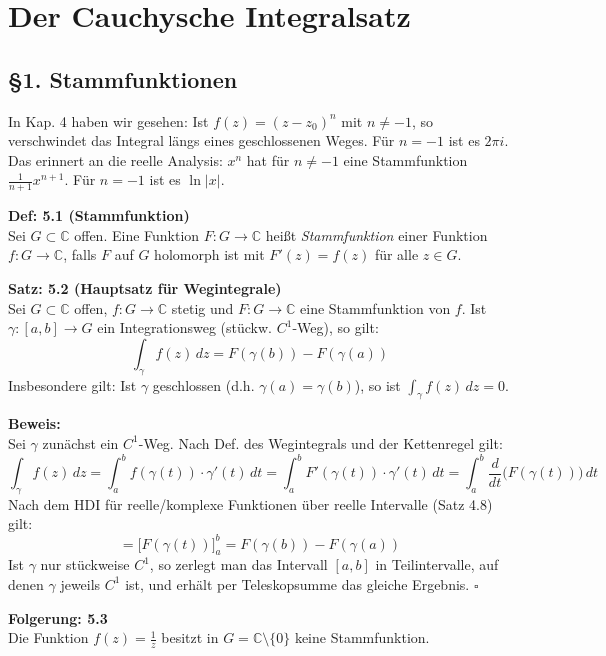 \section{Der Cauchysche Integralsatz}

\subsection*{\S 1. Stammfunktionen}

In Kap. 4 haben wir gesehen: Ist $f(z) = (z-z_0)^n$ mit $n \neq -1$, so verschwindet das Integral längs eines geschlossenen Weges. Für $n=-1$ ist es $2\pi i$. Das erinnert an die reelle Analysis: $x^n$ hat für $n \neq -1$ eine Stammfunktion $\frac{1}{n+1}x^{n+1}$. Für $n=-1$ ist es $\ln|x|$.

\vspace{1em}
\noindent\textbf{Def: 5.1 (Stammfunktion)} \\
Sei $G \subset \mathbb{C}$ offen. Eine Funktion $F: G \rightarrow \mathbb{C}$ heißt \textit{Stammfunktion} einer Funktion $f: G \rightarrow \mathbb{C}$, falls $F$ auf $G$ holomorph ist mit $F'(z) = f(z)$ für alle $z \in G$.

\vspace{1em}
\noindent\textbf{Satz: 5.2 (Hauptsatz für Wegintegrale)} \\
Sei $G \subset \mathbb{C}$ offen, $f: G \rightarrow \mathbb{C}$ stetig und $F: G \rightarrow \mathbb{C}$ eine Stammfunktion von $f$. Ist $\gamma: [a,b] \rightarrow G$ ein Integrationsweg (stückw. $C^1$-Weg), so gilt:
\[
\int_{\gamma} f(z) \, dz = F(\gamma(b)) - F(\gamma(a))
\]
Insbesondere gilt: Ist $\gamma$ geschlossen (d.h. $\gamma(a) = \gamma(b)$), so ist $\int_{\gamma} f(z) \, dz = 0$.

\vspace{1em}
\noindent\textbf{Beweis:} \\
Sei $\gamma$ zunächst ein $C^1$-Weg. Nach Def. des Wegintegrals und der Kettenregel gilt:
\[
\int_{\gamma} f(z) \, dz = \int_{a}^{b} f(\gamma(t)) \cdot \gamma'(t) \, dt = \int_{a}^{b} F'(\gamma(t)) \cdot \gamma'(t) \, dt = \int_{a}^{b} \frac{d}{dt} \big(F(\gamma(t))\big) \, dt
\]
Nach dem HDI für reelle/komplexe Funktionen über reelle Intervalle (Satz 4.8) gilt:
\[
= \big[F(\gamma(t))\big]_{a}^{b} = F(\gamma(b)) - F(\gamma(a))
\]
Ist $\gamma$ nur stückweise $C^1$, so zerlegt man das Intervall $[a,b]$ in Teilintervalle, auf denen $\gamma$ jeweils $C^1$ ist, und erhält per Teleskopsumme das gleiche Ergebnis. \hfill $\square$

\vspace{1em}
\noindent\textbf{Folgerung: 5.3} \\
Die Funktion $f(z) = \frac{1}{z}$ besitzt in $G = \mathbb{C} \setminus \{0\}$ keine Stammfunktion.

